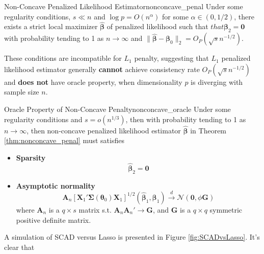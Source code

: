 \documentclass[twoside]{article}
\begin{document}
\begin{theorem}{Non-Concave Penalized Likelihood Estimator}{nonconcave_penal}
    Under some regularity conditions, $s\ll n$ and $\log p = O(n^{\alpha})$ for some $\alpha \in (0,1/2)$, there exists a strict local maximizer $\hat{\boldsymbol{\beta}}$ of penalized likelihood such that $that{\boldsymbol{\beta}}_2=\mathbf{0}$ with probability tending to 1 as $n\rightarrow \infty$ and $\lVert \hat{\boldsymbol{\beta}}-\boldsymbol{\beta}_0 \rVert _2=O_P(\sqrt{s}n^{-1/2})$.
\end{theorem}
These conditions are incompatible for $L_1$ penalty, suggesting that $L_1$ penalized likelihood estimator generally \textbf{cannot} achieve consistency rate $O_P(\sqrt{s}n^{-1/2})$ and \textbf{does not} have oracle property, when dimensionality $p$ is diverging with sample size $n$.

\begin{theorem}{Oracle Property of Non-Concave Penalty}{nonconcave_oracle}
    Under some regularity conditions and $s=o(n^{1/3})$, then with probability tending to 1 as $n\rightarrow \infty$, then non-concave penalized likelihood estimator $\hat{\boldsymbol{\beta}}$ in Theorem \ref{thm:nonconcave_penal} must satisfies 
    \begin{itemize}
        \item \textbf{Sparsity} $$\hat{\boldsymbol{\beta}}_2 =\mathbf{0}$$
        \item \textbf{Asymptotic normality} $$ \mathbf{A}_n \left[ \mathbf{X}_1' \boldsymbol{\Sigma}(\boldsymbol{\theta}_0)\mathbf{X}_1 \right]^{1/2}(\hat{\boldsymbol{\beta}}_1,\boldsymbol{\beta}_1) \xrightarrow{d} \mathcal{N}(\mathbf{0},\phi\mathbf{G}) $$
        where $\mathbf{A}_n$ is a $q\times s$ matrix s.t. $\mathbf{A}_n\mathbf{A}_n'\rightarrow \mathbf{G}$, and $\mathbf{G}$ is a $q\times q$ symmetric positive definite matrix.
    \end{itemize}
\end{theorem}

A simulation of SCAD versus Lasso is presented in Figure \ref{fig:SCADvsLasso}. It's clear that 
\end{document}
